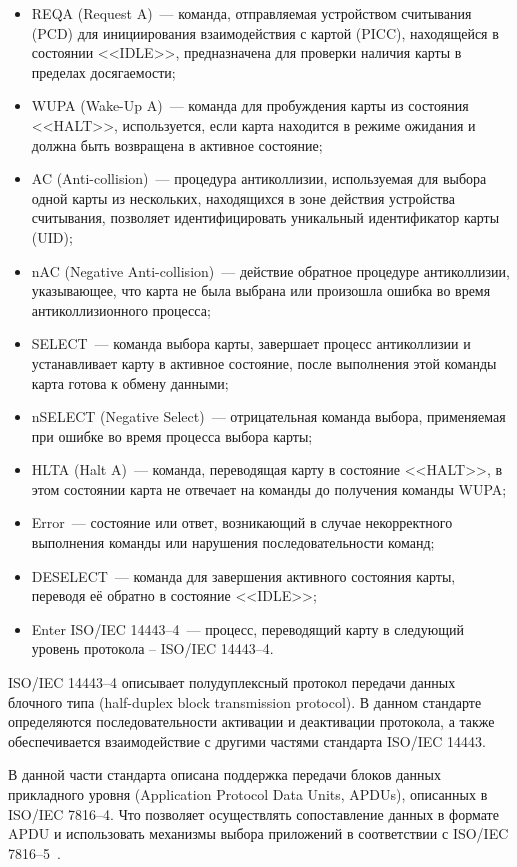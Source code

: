 \begin{itemize}
    \item REQA (Request A)~--- команда, отправляемая устройством считывания (PCD) для инициирования взаимодействия с картой (PICC), находящейся в состоянии <<IDLE>>, предназначена для проверки наличия карты в пределах досягаемости;
    \item WUPA (Wake-Up A)~--- команда для пробуждения карты из состояния <<HALT>>, используется, если карта находится в режиме ожидания и должна быть возвращена в активное состояние;
    \item AC (Anti-collision)~--- процедура антиколлизии, используемая для выбора одной карты из нескольких, находящихся в зоне действия устройства считывания, позволяет идентифицировать уникальный идентификатор карты (UID);
    \item nAC (Negative Anti-collision)~--- действие обратное процедуре антиколлизии, указывающее, что карта не была выбрана или произошла ошибка во время антиколлизионного процесса;
    \item SELECT~--- команда выбора карты, завершает процесс антиколлизии и устанавливает карту в активное состояние, после выполнения этой команды карта готова к обмену данными;
    \item nSELECT (Negative Select)~--- отрицательная команда выбора, применяемая при ошибке во время процесса выбора карты;
    \item HLTA (Halt A)~--- команда, переводящая карту в состояние <<HALT>>, в этом состоянии карта не отвечает на команды до получения команды WUPA;
    \item Error~--- состояние или ответ, возникающий в случае некорректного выполнения команды или нарушения последовательности команд;
    \item DESELECT~--- команда для завершения активного состояния карты, переводя её обратно в состояние <<IDLE>>;
    \item Enter ISO/IEC 14443--4~--- процесс, переводящий карту в следующий уровень протокола -- ISO/IEC 14443--4.
\end{itemize}


ISO/IEC 14443--4 описывает полудуплексный протокол передачи данных блочного типа (half-duplex block transmission protocol).
В данном стандарте определяются последовательности активации и деактивации протокола, а также обеспечивается взаимодействие с другими частями стандарта ISO/IEC 14443.

В данной части стандарта описана поддержка передачи блоков данных прикладного уровня (Application Protocol Data Units, APDUs), описанных в ISO/IEC 7816--4.
Что позволяет осуществлять сопоставление данных в формате APDU и использовать механизмы выбора приложений в соответствии с ISO/IEC 7816--5~\cite{iso_14443_en}.

